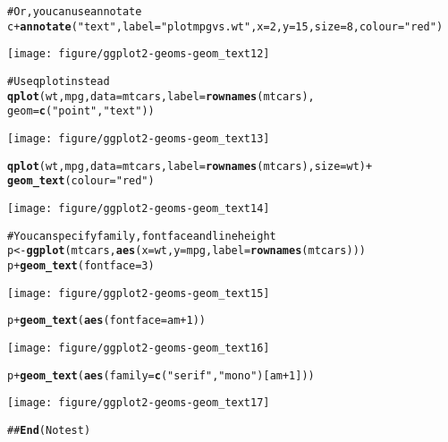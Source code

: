 \documentclass[a4paper,titlepage]{tufte-handout}\usepackage{graphicx, color}
\makeatletter
\def\maxwidth{ %
  \ifdim\Gin@nat@width>\linewidth
    \linewidth
  \else
    \Gin@nat@width
  \fi
}
\newcommand{\hlfunctioncall}[1]{\textcolor[rgb]{0.501960784313725,0,0.329411764705882}{\textbf{#1}}}%
\newcommand{\hlstring}[1]{\textcolor[rgb]{0.6,0.6,1}{#1}}%
\newcommand{\hlcomment}[1]{\textcolor[rgb]{0.180392156862745,0.6,0.341176470588235}{#1}}%
\newenvironment{kframe}{%
 \def\at@end@of@kframe{}%
 \ifinner\ifhmode%
  \def\at@end@of@kframe{\end{minipage}}%
  \begin{minipage}{\columnwidth}%
 \fi\fi%
 \def\FrameCommand##1{\hskip\@totalleftmargin \hskip-\fboxsep
 \colorbox{shadecolor}{##1}\hskip-\fboxsep
     \hskip-\linewidth \hskip-\@totalleftmargin \hskip\columnwidth}%
 \MakeFramed {\advance\hsize-\width
   \@totalleftmargin\z@ \linewidth\hsize
   \@setminipage}}%
 {\par\unskip\endMakeFramed%
 \at@end@of@kframe}
\newenvironment{knitrout}{}{} %
\makeatother
\begin{document}
\begin{knitrout}
\begin{kframe}
\begin{alltt}
\hlcomment{# Or, you can use annotate}
c + \hlfunctioncall{annotate}(\hlstring{"text"}, label = \hlstring{"plot mpg vs. wt"}, x = 2, y = 15, size = 8, colour = \hlstring{"red"})
\end{alltt}
\end{kframe}\texttt{[image: figure/ggplot2-geoms-geom\_text12]} \begin{kframe}\begin{alltt}
\hlcomment{# Use qplot instead}
\hlfunctioncall{qplot}(wt, mpg, data = mtcars, label = \hlfunctioncall{rownames}(mtcars),
   geom=\hlfunctioncall{c}(\hlstring{"point"}, \hlstring{"text"}))
\end{alltt}
\end{kframe}\texttt{[image: figure/ggplot2-geoms-geom\_text13]} \begin{kframe}\begin{alltt}
\hlfunctioncall{qplot}(wt, mpg, data = mtcars, label = \hlfunctioncall{rownames}(mtcars), size = wt) +
  \hlfunctioncall{geom_text}(colour = \hlstring{"red"})
\end{alltt}
\end{kframe}\texttt{[image: figure/ggplot2-geoms-geom\_text14]} \begin{kframe}\begin{alltt}
\hlcomment{# You can specify family, fontface and lineheight}
p <- \hlfunctioncall{ggplot}(mtcars, \hlfunctioncall{aes}(x=wt, y=mpg, label=\hlfunctioncall{rownames}(mtcars)))
p + \hlfunctioncall{geom_text}(fontface=3)
\end{alltt}
\end{kframe}\texttt{[image: figure/ggplot2-geoms-geom\_text15]} \begin{kframe}\begin{alltt}
p + \hlfunctioncall{geom_text}(\hlfunctioncall{aes}(fontface=am+1))
\end{alltt}
\end{kframe}\texttt{[image: figure/ggplot2-geoms-geom\_text16]} \begin{kframe}\begin{alltt}
p + \hlfunctioncall{geom_text}(\hlfunctioncall{aes}(family=\hlfunctioncall{c}(\hlstring{"serif"}, \hlstring{"mono"})[am+1]))
\end{alltt}
\end{kframe}\texttt{[image: figure/ggplot2-geoms-geom\_text17]} \begin{kframe}\begin{alltt}
\hlcomment{## \hlfunctioncall{End}(No test)}
\end{alltt}
\end{kframe}
\end{knitrout}
\end{document}
